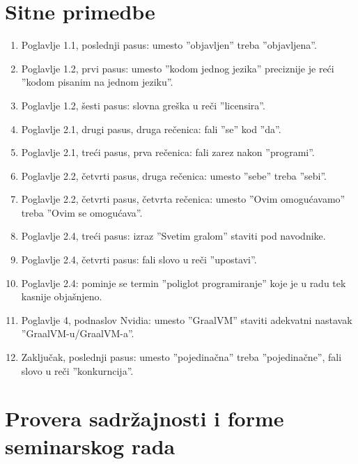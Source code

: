 \documentclass[a4paper]{report}
\begin{document}
	\section{Sitne primedbe}
	\begin{enumerate}
		\item Poglavlje 1.1, poslednji pasus: umesto ''objavljen'' treba ''objavljena''.\\
		\item Poglavlje 1.2, prvi pasus: umesto ''kodom jednog jezika'' preciznije je reći ''kodom pisanim na jednom jeziku''.\\
		\item Poglavlje 1.2, šesti pasus: slovna greška u reči ''licensira''.\\
		\item Poglavlje 2.1, drugi pasus, druga rečenica: fali ''se'' kod ''da''.\\
		\item Poglavlje 2.1, treći pasus, prva rečenica: fali zarez nakon ''programi''.\\
		\item Poglavlje 2.2, četvrti pasus, druga rečenica: umesto ''sebe'' treba ''sebi''.\\
		\item Poglavlje 2.2, četvrti pasus, četvrta rečenica: umesto ''Ovim omogućavamo''	treba ''Ovim se omogućava''.\\
		\item Poglavlje 2.4, treći pasus: izraz ''Svetim gralom''  staviti pod navodnike.\\
		\item Poglavlje 2.4, četvrti pasus: fali slovo u reči ''upostavi''.\\
		\item Poglavlje 2.4: pominje se termin ''poliglot programiranje'' koje je u radu tek kasnije objašnjeno.\\
		\item Poglavlje 4, podnaslov Nvidia: umesto ''GraalVM'' staviti adekvatni nastavak ''GraalVM-u/GraalVM-a''.\\
		\item Zaključak, poslednji pasus: umesto ''pojedinačna'' treba ''pojedinačne'', fali slovo u reči ''konkurncija''.\\
	\end{enumerate}
	
	\section{Provera sadržajnosti i forme seminarskog rada}
	
\end{document}
